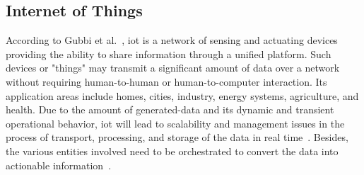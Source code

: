 


\subsection{Internet of Things}%
According to Gubbi et al.~\cite{Gubbi2013InternetDirections}, \gls{iot} is a network of sensing and actuating devices providing the ability to share information through a unified platform. Such devices or "things" may transmit a significant amount of data over a network without requiring human-to-human or human-to-computer interaction. Its application areas include homes, cities, industry, energy systems, agriculture, and health. Due to the amount of generated-data and its dynamic and transient operational behavior, \gls{iot} will lead to scalability and management issues in the process of transport, processing, and storage of the data in real time~\cite{Mijumbi2016NetworkChallenges}. Besides, the various entities involved need to be orchestrated to convert the data into actionable information~\cite{Consel2017InternetOrchestration}. 

